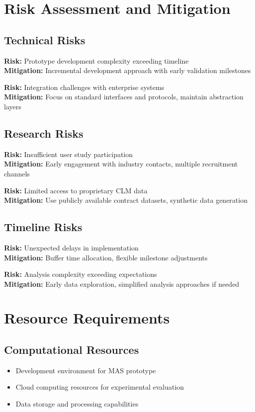 \section{Risk Assessment and Mitigation}

\subsection{Technical Risks}
\textbf{Risk:} Prototype development complexity exceeding timeline\\
\textbf{Mitigation:} Incremental development approach with early validation milestones

\textbf{Risk:} Integration challenges with enterprise systems\\
\textbf{Mitigation:} Focus on standard interfaces and protocols, maintain abstraction layers

\subsection{Research Risks}
\textbf{Risk:} Insufficient user study participation\\
\textbf{Mitigation:} Early engagement with industry contacts, multiple recruitment channels

\textbf{Risk:} Limited access to proprietary CLM data\\
\textbf{Mitigation:} Use publicly available contract datasets, synthetic data generation

\subsection{Timeline Risks}
\textbf{Risk:} Unexpected delays in implementation\\
\textbf{Mitigation:} Buffer time allocation, flexible milestone adjustments

\textbf{Risk:} Analysis complexity exceeding expectations\\
\textbf{Mitigation:} Early data exploration, simplified analysis approaches if needed

\section{Resource Requirements}

\subsection{Computational Resources}
\begin{itemize}
    \item Development environment for MAS prototype
    \item Cloud computing resources for experimental evaluation
    \item Data storage and processing capabilities
\end{itemize}

